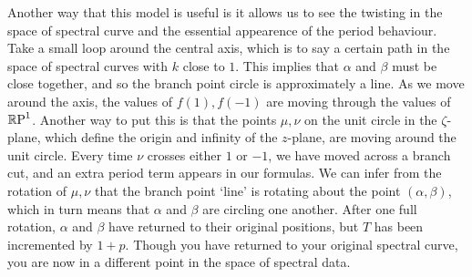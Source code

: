 Another way that this model is useful is it allows us to see the twisting in the space of spectral curve and the essential appearence of the period behaviour. Take a small loop around the central axis, which is to say a certain path in the space of spectral curves with $k$ close to $1$. This implies that $α$ and $β$ must be close together, and so the branch point circle is approximately a line.
As we move around the axis, the values of $f(1),f(-1)$ are moving through the values of $\mathbb{R}\text{P}^1$.
Another way to put this is that the points $μ,ν$ on the unit circle in the $ζ$-plane, which define the origin and infinity of the $z$-plane, are moving around the unit circle. Every time $ν$ crosses either $1$ or $-1$, we have moved across a branch cut, and an extra period term appears in our formulas.
We can infer from the rotation of $μ,ν$ that the branch point `line' is rotating about the point $(α, β)$, which in turn means that $α$ and $β$ are circling one another.
After one full rotation, $α$ and $β$ have returned to their original positions, but $T$ has been incremented by $1+p$. Though you have returned to your original spectral curve, you are now in a different point in the space of spectral data.






